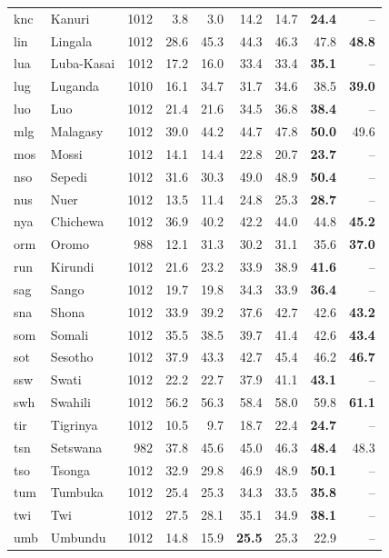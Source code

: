 {\begin{longtable}{@{}llrrrrrrr@{}}
knc & Kanuri & 1012 & 3.8 & 3.0 & 14.2 & 14.7 & \textbf{24.4} & -- \\
lin & Lingala & 1012 & 28.6 & 45.3 & 44.3 & 46.3 & 47.8 & \textbf{48.8} \\
lua & Luba-Kasai & 1012 & 17.2 & 16.0 & 33.4 & 33.4 & \textbf{35.1} & -- \\
lug & Luganda & 1010 & 16.1 & 34.7 & 31.7 & 34.6 & 38.5 & \textbf{39.0} \\
luo & Luo & 1012 & 21.4 & 21.6 & 34.5 & 36.8 & \textbf{38.4} & -- \\
mlg & Malagasy & 1012 & 39.0 & 44.2 & 44.7 & 47.8 & \textbf{50.0} & 49.6 \\
mos & Mossi & 1012 & 14.1 & 14.4 & 22.8 & 20.7 & \textbf{23.7} & -- \\
nso & Sepedi & 1012 & 31.6 & 30.3 & 49.0 & 48.9 & \textbf{50.4} & -- \\
nus & Nuer & 1012 & 13.5 & 11.4 & 24.8 & 25.3 & \textbf{28.7} & -- \\
nya & Chichewa & 1012 & 36.9 & 40.2 & 42.2 & 44.0 & 44.8 & \textbf{45.2} \\
orm & Oromo & 988 & 12.1 & 31.3 & 30.2 & 31.1 & 35.6 & \textbf{37.0} \\
run & Kirundi & 1012 & 21.6 & 23.2 & 33.9 & 38.9 & \textbf{41.6} & -- \\
sag & Sango & 1012 & 19.7 & 19.8 & 34.3 & 33.9 & \textbf{36.4} & -- \\
sna & Shona & 1012 & 33.9 & 39.2 & 37.6 & 42.7 & 42.6 & \textbf{43.2} \\
som & Somali & 1012 & 35.5 & 38.5 & 39.7 & 41.4 & 42.6 & \textbf{43.4} \\
sot & Sesotho & 1012 & 37.9 & 43.3 & 42.7 & 45.4 & 46.2 & \textbf{46.7} \\
ssw & Swati & 1012 & 22.2 & 22.7 & 37.9 & 41.1 & \textbf{43.1} & -- \\
swh & Swahili & 1012 & 56.2 & 56.3 & 58.4 & 58.0 & 59.8 & \textbf{61.1} \\
tir & Tigrinya & 1012 & 10.5 & 9.7 & 18.7 & 22.4 & \textbf{24.7} & -- \\
tsn & Setswana & 982 & 37.8 & 45.6 & 45.0 & 46.3 & \textbf{48.4} & 48.3 \\
tso & Tsonga & 1012 & 32.9 & 29.8 & 46.9 & 48.9 & \textbf{50.1} & -- \\
tum & Tumbuka & 1012 & 25.4 & 25.3 & 34.3 & 33.5 & \textbf{35.8} & -- \\
twi & Twi & 1012 & 27.5 & 28.1 & 35.1 & 34.9 & \textbf{38.1} & -- \\
umb & Umbundu & 1012 & 14.8 & 15.9 & \textbf{25.5} & 25.3 & 22.9 & -- \\

\end{longtable}}
